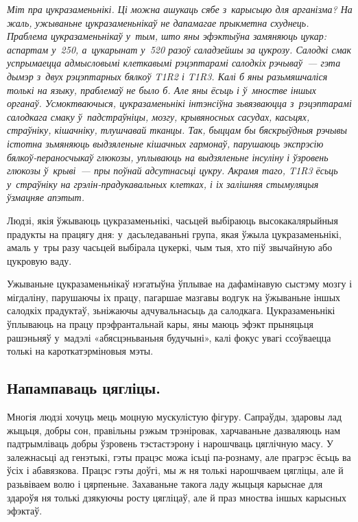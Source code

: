\emph{Міт пра цукразаменьнікі. Ці можна ашукаць сябе з~карысьцю для арганізма? На жаль, ужываньне цукразаменьнікаў не дапамагае прыкметна схуднець. Праблема цукразаменьнікаў у~тым, што яны эфэктыўна замяняюць цукар: аспартам у~250, а~цукарынат у~520 разоў саладзейшы за цукрозу. Салодкі смак успрымаецца адмысловымі клеткавымі рэцэптарамі салодкіх рэчываў~--- гэта дымэр з~двух рэцэптарных бялкоў T1R2 і T1R3. Калі б яны разьмяшчаліся толькі на языку, праблемаў не было б. Але яны ёсьць і ў~мностве іншых органаў. Усмоктваючыся, цукразаменьнікі інтэнсіўна зьвязваюцца з~рэцэптарамі салодкага смаку ў~падстраўніцы, мозгу, крывяносных сасудах, касьцях, страўніку, кішачніку, тлушчавай тканцы. Так, быццам бы бяскрыўдныя рэчывы істотна зьмяняюць выдзяленьне кішачных гармонаў, парушаюць экспрэсію бялкоў-пераносчыкаў глюкозы, уплываюць на выдзяленьне інсуліну і ўзровень глюкозы ў~крыві~--- пры поўнай адсутнасьці цукру. Акрамя таго, T1R3 ёсьць у~страўніку на грэлін-прадукавальных клетках, і іх залішняя стымуляцыя ўзмацняе апэтыт.}


Людзі, якія ўжываюць цукразаменьнікі, часьцей выбіраюць высокакалярыйныя прадукты на працягу дня: у~дасьледаваньні група, якая ўжыла цукразаменьнікі, амаль у~тры разу часьцей выбірала цукеркі, чым тыя, хто піў звычайную або цукровую ваду.

Ужываньне цукразаменьнікаў нэгатыўна ўплывае на дафамінавую сыстэму мозгу і мігдаліну, парушаючы іх працу, пагаршае мазгавы водгук на ўжываньне іншых салодкіх прадуктаў, зьніжаючы адчувальнасьць да салодкага. Цукразаменьнікі ўплываюць на працу прэфрантальнай кары, яны маюць эфэкт прыняцьця рашэньняў у~мадэлі «абясцэньваньня будучыні», калі фокус увагі ссоўваецца толькі на кароткатэрміновыя мэты.

\subsection*{Напампаваць цягліцы.}

Многія людзі хочуць мець моцную мускулістую фігуру. Сапраўды, здаровы лад жыцьця, добры сон, правільны рэжым трэніровак, харчаваньне дазваляюць нам падтрымліваць добры ўзровень тэстастэрону і нарошчваць цяглічную масу. У залежнасьці ад генэтыкі, гэты працэс можа ісьці па-рознаму, але прагрэс ёсьць ва ўсіх і абавязкова. Працэс гэты доўгі, мы ж ня толькі нарошчваем цягліцы, але й разьвіваем волю і цярпеньне. Захаваньне такога ладу жыцьця карыснае для здароўя ня толькі дзякуючы росту цягліцаў, але й праз мноства іншых карысных эфэктаў.

